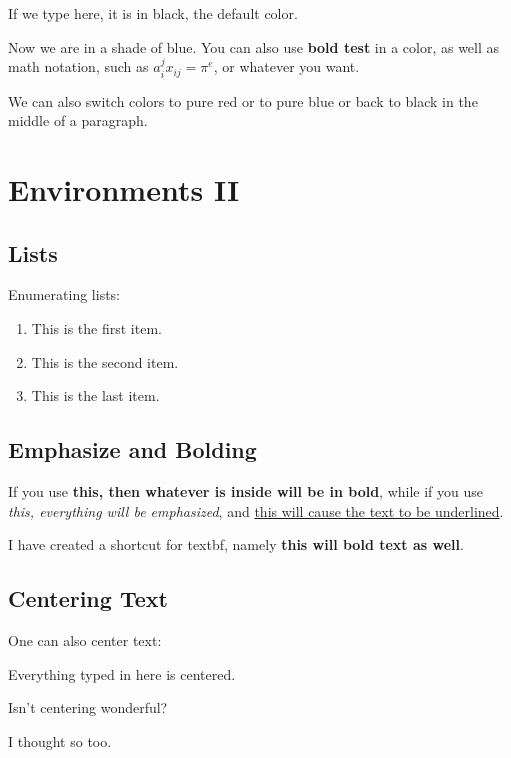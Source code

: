 \documentclass[12pt,reqno]{amsart}
\newcommand{\tbf}[1]{\textbf{#1}}
\numberwithin{equation}{section}
\begin{document}
If we type here, it is in black, the default color.

{\color[rgb]{0,0,.85} Now we are in a shade of blue. You can also
use \textbf{bold test} in a color, as well as math notation, such
as $a_i^j x_{ij} = \pi^e$, or whatever you want.}

We can also {\color[rgb]{1,0,0}switch colors to pure red} or to
{\color[rgb]{0,0,1}pure blue} or back to black in the middle of a
paragraph.


\section{Environments II}

\subsection{Lists}

Enumerating lists:

\begin{enumerate}

\item This is the first item.
\item This is the second item.
\item This is the last item.

\end{enumerate}


\subsection{Emphasize and Bolding}

If you use \textbf{this, then whatever is inside will be in bold},
while if you use \emph{this, everything will be emphasized}, and
\underline{this will cause the text to be underlined}.

I have created a shortcut for textbf, namely \tbf{this will bold
text as well}.


\subsection{Centering Text}

One can also center text:

\begin{center}

Everything typed in here is centered.

Isn't centering wonderful?

I thought so too.

\end{center}
\end{document}
